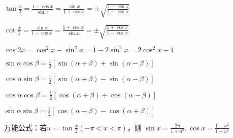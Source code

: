 \begin{spacing}{\hangju}
\begin{multicols}{2}
    \end{multicols}

    \noindent $\displaystyle \tan{ \frac{x}{2} } = \frac{ 1-\cos{x} }{ \sin{x} }=\frac{\sin{x}}{1+\cos{x}} = \pm \sqrt{\frac{1 - \cos{x}}{1 + \cos{x}}}$

    \noindent $\displaystyle \cot{\frac{x}{2}} = \frac{\sin{x}}{1-\cos{x}} = \frac{1+\cos{x}}{\sin{x}} = \pm \sqrt{\frac{1 + \cos{x}}{1 - \cos{x}}}$

    \noindent $\cos{2x}=\cos^2{x}-\sin^2{x}=1-2\sin^2{x}=2\cos^2{x}-1$

    \noindent $\sin{\alpha}\cos{\beta}=\frac{1}{2}[\sin{(\alpha+\beta)}+\sin{(\alpha-\beta)}]$

    \noindent $\cos{\alpha}\sin{\beta} = \frac{1}{2} [\sin{(\alpha+\beta)} - \sin{(\alpha-\beta)}]$

    \noindent $\cos{\alpha}\cos{\beta}=\frac{1}{2}[\cos{(\alpha+\beta)}+\cos{(\alpha-\beta)}]$

    \noindent $\sin{\alpha}\sin{\beta} =
        \frac{1}{2}[\cos{(\alpha-\beta)}-\cos{(\alpha+\beta)}]$

    \noindent 万能公式：若$u=\tan{\frac{x}{2}}(-\pi<x<\pi)$，则
        $\sin{x}=\frac{2u}{1+u^2}, \cos{x}=\frac{1-u^2}{1+u^2}$

\end{spacing}